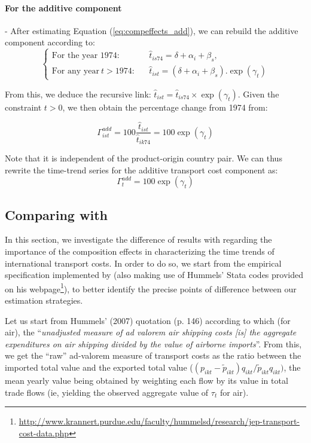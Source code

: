 \documentclass[a4paper,11pt]{article}
\begin{document}
\paragraph{For the additive component} - After estimating Equation (\ref{eq:compeffects_add}), we can rebuild the additive component according to:
\[\left\{
  \begin{array}{lcl}
\text{For the year 1974:}&&\widehat{t}_{is74}=  \delta + \alpha_i+ \beta_s, \\
\text{For any year}~t> 1974:&&\widehat{t}_{ist}=\left(\delta + \alpha_i+ \beta_s\right).\exp(\gamma_t)
\end{array}
\right.\]

From this, we deduce the recursive link: $\widehat{t}_{ist} = \widehat{t}_{is74} \times \exp(\gamma_t)$.
Given the constraint $t>0$, we then obtain the percentage change from 1974 from:

\begin{equation}
\Gamma^{add}_{ist} = 100\frac{\widehat{t}_{ist}}{\widehat{t}_{ik74}} = 100\exp(\gamma_t) \label{eq:indice_add}
\end{equation}

\noindent Note that it is independent of the product-origin country pair. We can thus rewrite the time-trend series for the additive transport cost component as:
\begin{equation}
\Gamma^{add}_t  = 100\exp(\gamma_t) \label{eq:tcadd_compoeffect}
\end{equation}


\subsection{Comparing with \cite{hummels2007} \label{app:compare_Hummels}}

In this section, we investigate the difference of results with \cite{hummels2007} regarding the importance of the composition effects in characterizing the time trends of international transport costs.
In order to do so, we start from the empirical specification implemented by \cite{hummels2007} (also making use of Hummels' Stata codes provided on his webpage\footnote{\url{http://www.krannert.purdue.edu/faculty/hummelsd/research/jep-transport-cost-data.php}}), to better identify the precise points of difference between our estimation strategies.

Let us start from Hummels' (2007) quotation (p.
146) according to which (for air), the ``\textit{unadjusted measure of ad valorem air shipping costs [is] the aggregate expenditures on air shipping divided by the value of airborne imports}''.
From this, we get the ``raw'' ad-valorem measure of transport costs as the ratio between the imported total value and the exported total value ($(p_{ikt} - \widetilde{p}_{ikt})q_{ikt}/\widetilde{p}_{ikt}q_{ikt})$, the mean yearly value being obtained by weighting each flow by its value in total trade flows (ie, yielding the observed aggregate value of $\tau_t$ for air).
\end{document}
